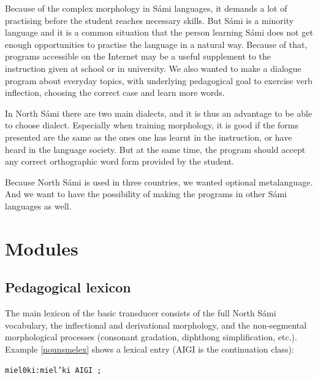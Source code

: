 \documentclass[11pt]{article}
\begin{document}
Because of the complex morphology in Sámi languages, it demands a lot of practising before the student reaches necessary skills. But Sámi is a minority language and it is a common situation that the person learning Sámi does not get enough opportunities to practise the language in a natural way. Because of that, programs accessible on the Internet may be a useful supplement to the instruction given at school or in university. We also wanted to make a dialogue program about everyday topics, with underlying pedagogical goal to exercise verb inflection, choosing the correct case and learn more words. 

In North Sámi there are two main dialects, and it is thus an advantage to be able to choose dialect. Especially when training morphology, it is good if the forms presented are the same as the ones one has learnt in the instruction, or have heard in the language society. But at the same time, the program should accept any correct orthographic word form provided by the student.

Because North Sámi is used in three countries, we wanted optional metalanguage. And we want to have the possibility of making the programs in other Sámi languages as well.


\section{Modules}

\subsection{Pedagogical lexicon}

The main lexicon of the basic transducer consists of the full North Sámi vocabulary, the inflectional and derivational morphology, and the non-segmental morphological processes (consonant gradation, diphthong simplification, etc.). Example \ref{nounsmelex} shows a lexical entry (AIGI is the continuation class):

\begin{example}\label{nounsmelex}
\begin{itemize}
\texttt{miel0ki:miel'ki AIGI ;}
\end{itemize}
\end{example}

\end{document}
